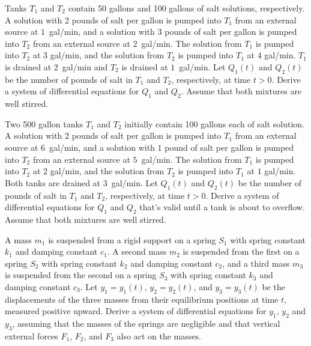 \exercises

\begin{exerciselist}
  \item\label{exer:10.1.1} Tanks $T_{1}$ and $T_{2}$ contain 50 gallons and 100 gallons of salt
        solutions, respectively. A solution with 2 pounds of salt per gallon is pumped into $T_{1}$
        from an external source at $1$~gal/min, and a solution with $3$ pounds of salt per gallon is
        pumped into $T_{2}$ from an external source at $2$~gal/min. The solution from $T_{1}$ is
        pumped into $T_{2}$ at $3$ gal/min, and the solution from $T_{2}$ is pumped into $T_{1}$ at
        $4$ gal/min. $T_{1}$ is drained at $2$~gal/min and $T_{2}$ is drained at $1$~gal/min. Let
        $Q_{1}(t)$ and $Q_{2}(t)$ be the number of pounds of salt in $T_{1}$ and $T_{2}$,
        respectively, at time $t>0$. Derive a system of differential equations for $Q_{1}$ and
        $Q_{2}$. Assume that both mixtures are well stirred.

  \item\label{exer:10.1.2} Two 500 gallon tanks $T_{1}$ and $T_{2}$ initially contain 100 gallons
        each of salt solution. A solution with $2$ pounds of salt per gallon is pumped into $T_{1}$
        from an external source at $6$~gal/min, and a solution with $1$ pound of salt per gallon is
        pumped into $T_{2}$ from an external source at $5$~gal/min. The solution from $T_{1}$ is
        pumped into $T_{2}$ at $2$ gal/min, and the solution from $T_{2}$ is pumped into $T_{1}$ at
        $1$ gal/min. Both tanks are drained at $3$~gal/min. Let $Q_{1}(t)$ and $Q_{2}(t)$ be the
        number of pounds of salt in $T_{1}$ and $T_{2}$, respectively, at time $t>0$. Derive a
        system of differential equations for $Q_{1}$ and $Q_{2}$ that's valid until a tank is about
        to overflow. Assume that both mixtures are well stirred.

  \item\label{exer:10.1.3} A mass $m_{1}$ is suspended from a rigid support on a spring $S_{1}$ with
        spring constant $k_{1}$ and damping constant $c_{1}$. A second mass $m_{2}$ is suspended
        from the first on a spring $S_{2}$ with spring constant $k_{2}$ and damping constant
        $c_{2}$, and a third mass $m_{3}$ is suspended from the second on a spring $S_{3}$ with
        spring constant $k_{3}$ and damping constant $c_{3}$. Let $y_{1}=y_{1}(t)$,
        $y_{2}=y_{2}(t)$, and $y_{3}=y_{3}(t)$ be the displacements of the three masses from their
        equilibrium positions at time $t$, measured positive upward. Derive a system of differential
        equations for $y_{1}$, $y_{2}$ and $y_{3}$, assuming that the masses of the springs are
        negligible and that vertical external forces $F_{1}$, $F_{2}$, and $F_{3}$ also act on the
        masses.


\end{exerciselist}
